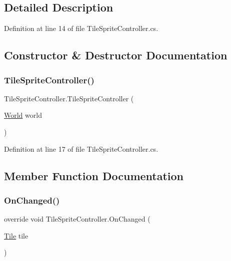 \subsection{Detailed Description}


Definition at line 14 of file Tile\+Sprite\+Controller.\+cs.



\subsection{Constructor \& Destructor Documentation}
\mbox{\label{class_tile_sprite_controller_a09d6b482d02309ed99195801d1ee4829}} 
\subsubsection{\texorpdfstring{Tile\+Sprite\+Controller()}{TileSpriteController()}}
{\footnotesize\ttfamily Tile\+Sprite\+Controller.\+Tile\+Sprite\+Controller (\begin{DoxyParamCaption}\item[{\hyperlink{class_world}{World}}]{world }\end{DoxyParamCaption})}



Definition at line 17 of file Tile\+Sprite\+Controller.\+cs.



\subsection{Member Function Documentation}
\mbox{\label{class_tile_sprite_controller_a05a9fbf8a51dd3c38733339c3f1cb143}} 
\subsubsection{\texorpdfstring{On\+Changed()}{OnChanged()}}
{\footnotesize\ttfamily override void Tile\+Sprite\+Controller.\+On\+Changed (\begin{DoxyParamCaption}\item[{\hyperlink{class_tile}{Tile}}]{tile }\end{DoxyParamCaption})\hspace{0.3cm}{\ttfamily [protected]}}



